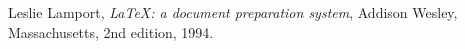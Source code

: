 \begin{thebibliography}{99}

  Leslie Lamport,
  \emph{\LaTeX: a document preparation system},
  Addison Wesley, Massachusetts,
  2nd edition,
  1994.

\end{thebibliography}


